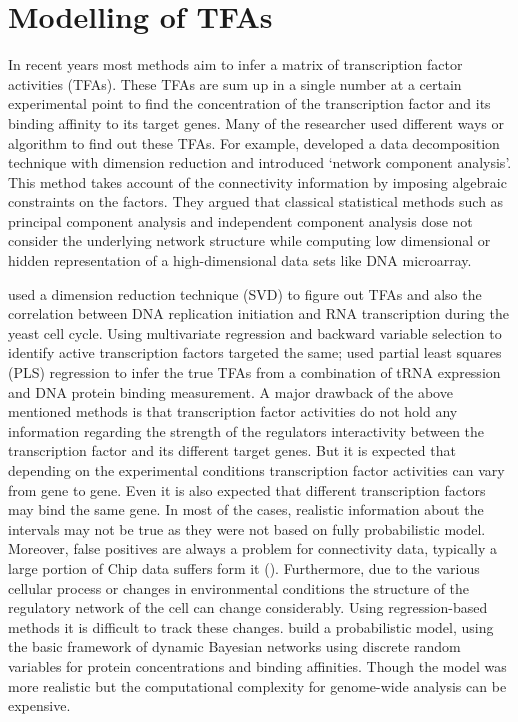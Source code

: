 \section{Modelling of TFAs}
% 
%
In recent years most methods aim to infer a matrix of transcription factor activities (TFAs).
These TFAs are sum up in a single number at a certain experimental point to find 
the concentration of the transcription factor and its binding affinity to its target genes. 
Many of the researcher used different ways or algorithm to find out these TFAs. 
For example, \cite{Liao:2003} developed a data decomposition technique with dimension reduction and 
introduced ‘network component analysis’. This method takes account of the connectivity information 
by imposing algebraic constraints on the factors. They argued that classical statistical methods
such as principal component analysis and independent component analysis dose not consider the underlying 
network structure while computing low dimensional or hidden representation of a high-dimensional data sets 
like DNA microarray. 

\cite{Alter:2004} used a dimension reduction technique (SVD) to figure out TFAs and also the 
correlation between DNA replication initiation and RNA transcription during the yeast cell cycle. 
Using multivariate regression and backward variable selection 
to identify active transcription factors \cite{Gao:2004} targeted the same; 
\cite{Boulesteix:2005} used partial least squares (PLS) regression to infer the true TFAs 
from a combination of tRNA expression and DNA protein binding measurement. 
A major drawback of the above mentioned methods is that transcription factor activities do not 
hold any information regarding the strength of the regulators interactivity between the 
transcription factor and its different target genes. But it is expected that 
depending on the experimental conditions transcription factor activities can vary from gene to gene. 
Even it is also expected that different transcription factors may bind the same gene. 
In most of the cases, realistic information about the intervals may not be true as they were 
not based on fully probabilistic model. Moreover, false positives are always a problem for 
connectivity data, typically a large portion of Chip data suffers form it 
(\cite{Boulesteix:2005}). 
Furthermore, due to the various cellular process or changes in environmental conditions 
the structure of the regulatory network of the cell can change considerably.
Using regression-based methods it is difficult to track these changes. 
\cite{Nachman:2004} build a probabilistic model, using the basic framework of 
dynamic Bayesian networks using discrete random variables for protein concentrations 
and binding affinities. Though the model was more realistic but the computational complexity for 
genome-wide analysis can be expensive.

